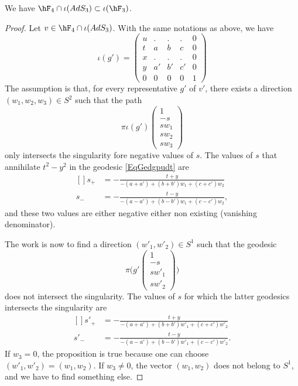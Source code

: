 \begin{proposition}		\label{PropFqTroisFt}
We have $\hF_4\cap\iota(AdS_3)\subset \iota(\hF_3)$.
\end{proposition}

\begin{proof}
Let $v\in\hF_4\cap\iota(AdS_3)$. With the same notations as above, we have
\begin{equation}		\label{EqRepresSOiotag}
	\iota(g')=
\begin{pmatrix}
 u	&	.	&	.	&	.	&	0\\ 
 t	&	a	&	b	&	c	&	0\\ 
 x	&	.	&	.	&	.	&	0\\ 
 y	&	a'	&	b'	&	c'	&	0\\ 
0	&	0	&	0	&	0	&	1 
 \end{pmatrix}
\end{equation}
The assumption is that, for every representative $g'$ of $v'$, there exists a direction $(w_1,w_2,w_3)\in S^2$ such that the path
\begin{equation}		\label{EqGedgpudt}
	\pi   \iota(g')\begin{pmatrix}
	1	\\ 
	-s	\\ 
	sw_1	\\ 
	sw_2	\\ 
	sw_3	
\end{pmatrix} 
\end{equation}
only intersects the singularity fore negative values of $s$. The values of $s$ that annihilate $t^2-y^2$ in the geodesic \eqref{EqGedgpudt} are
\begin{equation}
	\begin{aligned}[]
		s_+	&=-\frac{ t+y }{ -(a+a')+(b+b')w_1+(c+c')w_2 }\\
		s_-	&=-\frac{ t-y }{ -(a-a')+(b-b')w_1+(c-c')w_2 },
	\end{aligned}
\end{equation}
and these two values are either negative either non existing (vanishing denominator).

The work is now to find a direction $(w'_1,w'_2)\in S^1$ such that the geodesic
\begin{equation}
	\pi\big( g'\begin{pmatrix}
	1	\\ 
	-s	\\ 
	sw'_1	\\ 
	sw'_2	
\end{pmatrix} \big)
\end{equation}
does not intersect the singularity. The values of $s$ for which the latter geodesics intersects the singularity are
\begin{equation}
	\begin{aligned}[]
		s'_+	&=-\frac{ t+y }{ -(a+a')+(b+b')w'_1+(c+c')w'_2 }\\
		s'_-	&=-\frac{ t-y }{ -(a-a')+(b-b')w'_1+(c-c')w'_2 }.
	\end{aligned}
\end{equation}
If $w_3=0$, the proposition is true because one can choose $(w'_1,w'_2)=(w_1,w_2)$. If $w_3\neq 0$, the vector $(w_1,w_2)$ does not belong to $S^1$, and we have to find something else.


\end{proof}
